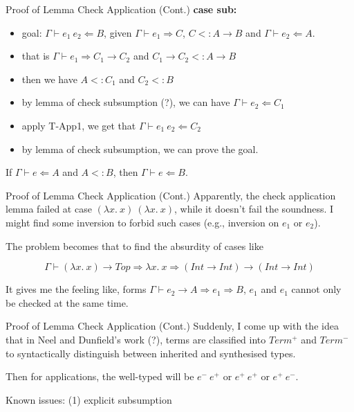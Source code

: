 \documentclass[compress,12pt,aspectratio=169]{beamer}
\begin{document}
\begin{frame}{Proof of Lemma Check Application (Cont.)}
\textbf{case sub:}
\begin{itemize}
	\item goal: $\Gamma \vdash e_1~e_2 \Leftarrow B$, given $\Gamma \vdash e_1 \Rightarrow C$, $C <: A \rightarrow B$ and $\Gamma \vdash e_2 \Leftarrow A$.
	\item that is $\Gamma \vdash e_1 \Rightarrow C_1 \rightarrow C_2$ and $C_1 \rightarrow C_2 <: A \rightarrow B$
	\item then we have $A <: C_1$ and $C_2 <: B$
	\item by lemma of check subsumption (?), we can have $\Gamma \vdash e_2 \Leftarrow C_1$
	\item apply T-App1, we get that $\Gamma \vdash e_1~e_2 \Leftarrow C_2$
	\item by lemma of check subsumption, we can prove the goal. 
\end{itemize}

\begin{lemma}
If $\Gamma \vdash e \Leftarrow A$	and $A <: B$, then $\Gamma \vdash e \Leftarrow B$.
\end{lemma}
\end{frame}

\begin{frame}{Proof of Lemma Check Application (Cont.)}
Apparently, the check application lemma failed at case $(\lambda x.~x)~(\lambda x.~x)$, while it doesn't fail the soundness. I might find some inversion to forbid such cases (e.g., inversion on $e_1$ or $e_2$).

The problem becomes that to find the absurdity of cases like
	
$$
\Gamma \vdash \boxed{(\lambda x.~x)} \rightarrow Top \Rightarrow \lambda x.~x \Rightarrow (Int \rightarrow Int) \rightarrow (Int \rightarrow Int)
$$

It gives me the feeling like, forms $\Gamma \vdash \boxed{e_2} \rightarrow A \Rightarrow e_1 \Rightarrow B$, $e_1$ and $e_1$ cannot only be checked at the same time.
\end{frame}

\begin{frame}{Proof of Lemma Check Application (Cont.)}
Suddenly, I come up with the idea that in Neel and Dunfield's work (?), terms are classified into $Term^+$ and $Term^-$ to syntactically distinguish between inherited and synthesised types.

Then for applications, the well-typed will be $e^- ~ e^+$ or $e^+ ~ e^+$ or $e^+ ~ e^-$. 

Known issues: (1) explicit subsumption
\end{frame}
\end{document}
